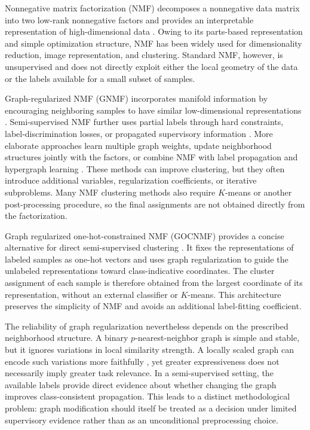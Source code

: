 \documentclass[11pt]{article}
\theoremstyle{remark}
\begin{document}
Nonnegative matrix factorization (NMF) decomposes a nonnegative data matrix into two low-rank nonnegative factors and provides an interpretable representation of high-dimensional data \cite{Lee1999NMF,Lee2000Algorithms}. Owing to its parts-based representation and simple optimization structure, NMF has been widely used for dimensionality reduction, image representation, and clustering. Standard NMF, however, is unsupervised and does not directly exploit either the local geometry of the data or the labels available for a small subset of samples.

Graph-regularized NMF (GNMF) incorporates manifold information by encouraging neighboring samples to have similar low-dimensional representations \cite{Cai2011GNMF}. Semi-supervised NMF further uses partial labels through hard constraints, label-discrimination losses, or propagated supervisory information \cite{Liu2012CNMF,Mo2024PNLPSCNMF,Xing2021GNMFLD}. More elaborate approaches learn multiple graph weights, update neighborhood structures jointly with the factors, or combine NMF with label propagation and hypergraph learning \cite{Jing2026SNMFWLP,Li2023ABNMTF,Ren2025AHSSNMF,Yang2025SPNMF,Yi2020AGSSNMF,Zhang2021MSNMF}. These methods can improve clustering, but they often introduce additional variables, regularization coefficients, or iterative subproblems. Many NMF clustering methods also require $K$-means or another post-processing procedure, so the final assignments are not obtained directly from the factorization.

Graph regularized one-hot-constrained NMF (GOCNMF) provides a concise alternative for direct semi-supervised clustering \cite{Li2025GOCNMF}. It fixes the representations of labeled samples as one-hot vectors and uses graph regularization to guide the unlabeled representations toward class-indicative coordinates. The cluster assignment of each sample is therefore obtained from the largest coordinate of its representation, without an external classifier or $K$-means. This architecture preserves the simplicity of NMF and avoids an additional label-fitting coefficient.

The reliability of graph regularization nevertheless depends on the prescribed neighborhood structure. A binary $p$-nearest-neighbor graph is simple and stable, but it ignores variations in local similarity strength. A locally scaled graph can encode such variations more faithfully \cite{Zelnik2004SelfTuning}, yet greater expressiveness does not necessarily imply greater task relevance. In a semi-supervised setting, the available labels provide direct evidence about whether changing the graph improves class-consistent propagation. This leads to a distinct methodological problem: graph modification should itself be treated as a decision under limited supervisory evidence rather than as an unconditional preprocessing choice.
\end{document}
